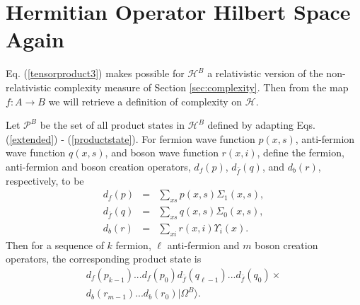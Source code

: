 \documentclass[12pt,amsmath,amssymb,onecolumn]{revtex4-2}
\begin{document}
\section{ \label{subsec:auxiliaryoperatorspace} Hermitian Operator Hilbert Space Again} 

Eq. (\ref{tensorproduct3}) makes possible for $\mathcal{H}^B$
a relativistic version of the 
non-relativistic complexity measure of Section \ref{sec:complexity}.
Then from the map $f:A \rightarrow B$ we will retrieve a definition
of complexity on $\mathcal{H}$.

Let $\mathcal{P}^B$ be the set of all product states in $\mathcal{H}^B$
defined by adapting Eqs. (\ref{extended}) - (\ref{productstate}).
For fermion wave function $p(x,s)$, anti-fermion wave function $q(x,s)$,
and boson wave function $r(x, i)$,
define the fermion, anti-fermion and boson creation operators, $d_f( p)$, $d_{\bar{f}}( q)$,
and $d_b( r)$, respectively, to be
\begin{subequations}
\begin{eqnarray}
\label{extendedf}
d_f( p) &=& \sum_{x s} p(x, s) \Sigma_1( x, s), \\
\label{extendedfbar}
d_{\bar{f}}( q) &=& \sum_{x s} q(x,s) \Sigma_0( x, s), \\
\label{extendedbi}
d_b( r) &=& \sum_{x i} r(x, i) \Upsilon_i( x).
\end{eqnarray}
\end{subequations}
Then for a sequence of 
$k$ fermion, $\ell$ anti-fermion and $m$ boson creation operators,
the corresponding product state is 
\begin{multline}
\label{productstater}
d_f( p_{k - 1}) ... d_f( p_0)
  d_{\bar{f}}( q_{\ell - 1}) ... d_{\bar{f}}( q_0) \times \\
  d_b( r_{m-1}) ... d_b( r_0) |\Omega^B \rangle .
\end{multline}
\end{document}
